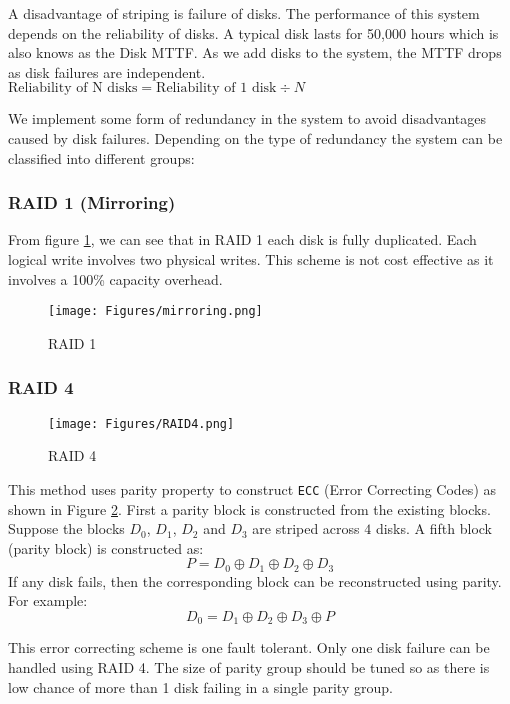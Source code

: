 \documentclass[twoside]{article}
\begin{document}
A disadvantage of striping is failure of disks. The performance of this system depends on the reliability of disks. A typical disk lasts for 50,000 hours which is also knows as the Disk MTTF. As we add disks to the system, the MTTF drops as disk failures are independent.\\

$\textrm{Reliability of N disks} = \textrm{Reliability of 1 disk} \div N$

We implement some form of redundancy in the system to avoid disadvantages caused by disk failures. Depending on the type of redundancy the system can be classified into different groups:

\subsubsection{RAID 1 (Mirroring)}
From figure \ref{fig:RAID1}, we can see that in RAID 1 each disk is fully duplicated. Each logical write involves two physical writes. This scheme is not cost effective as it involves a 100\% capacity overhead.
\begin{figure}[htbp]
\centering
\texttt{[image: Figures/mirroring.png]}
\caption{RAID 1} \label{fig:RAID1}
\end{figure}

\subsubsection{RAID 4}
\begin{figure}[htbp]
\centering
\texttt{[image: Figures/RAID4.png]}
\caption{RAID 4} \label{fig:RAID4}
\end{figure}
This method uses parity property to construct \texttt{ECC} (Error Correcting Codes) as shown in Figure \ref{fig:RAID4}. First a parity block is constructed from the existing blocks. Suppose the blocks $D_0$, $D_1$, $D_2$ and $D_3$ are striped across $4$ disks. A fifth block (parity block) is constructed as:
\begin{equation}
P = D_0 \oplus D_1 \oplus D_2 \oplus D_3 \nonumber
\end{equation}
If any disk fails, then the corresponding block can be reconstructed using parity. For example:
\begin{equation}
D_0 =  D_1 \oplus D_2 \oplus D_3 \oplus P \nonumber
\end{equation}

This error correcting scheme is one fault tolerant. Only one disk failure can be handled using RAID 4. The size of parity group should be tuned so as there is low chance of more than 1 disk failing in a single parity group.
\end{document}

